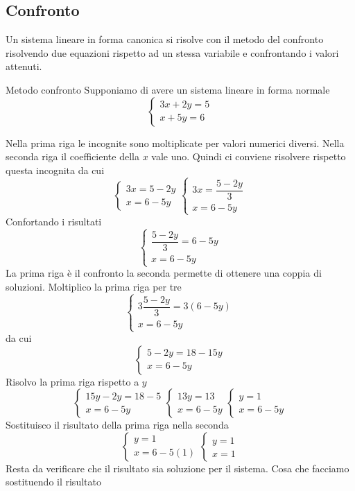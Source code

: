 \subsection{Confronto}
\label{sec:Confronto}
Un sistema lineare in forma canonica si risolve con il metodo del confronto risolvendo due equazioni rispetto ad un stessa variabile e confrontando i valori attenuti.
\begin{esempiot}{Metodo confronto}{}
	Supponiamo di avere un sistema lineare in forma normale
	\[
	\begin{cases}
	3x+2y=5\\
	x+5y=6
	\end{cases}
	\]
\end{esempiot}
 Nella prima riga le incognite sono moltiplicate per valori numerici diversi. Nella seconda riga il coefficiente della $x$ vale uno. Quindi ci conviene risolvere rispetto questa incognita da cui   \[
\begin{cases}
3x=5-2y\\
x=6-5y
\end{cases}\begin{cases}
3x=\dfrac{5-2y}{3}\\
x=6-5y
\end{cases}
\]
Confortando i risultati	\[\begin{cases}
\dfrac{5-2y}{3}=6-5y\\
x=6-5y
\end{cases}
\]La prima riga è il confronto la seconda permette di ottenere una coppia di soluzioni. Moltiplico la prima riga per tre \[\begin{cases}
3\dfrac{5-2y}{3}=3(6-5y)\\
x=6-5y
\end{cases}
\]
da cui \[\begin{cases}
5-2y=18-15y\\
x=6-5y
\end{cases}
\]Risolvo la prima riga rispetto a $y$\[\begin{cases}
15y-2y=18-5\\
x=6-5y
\end{cases}
\begin{cases}
13y=13\\
x=6-5y
\end{cases}
\begin{cases}
y=1\\
x=6-5y
\end{cases}
\]
Sostituisco il risultato della prima riga nella seconda\[\begin{cases}
y=1\\
x=6-5(1)
\end{cases}
\begin{cases}
y=1\\
x=1
\end{cases}
 \]Resta da verificare che il risultato sia soluzione per il sistema. Cosa che facciamo sostituendo il risultato 

